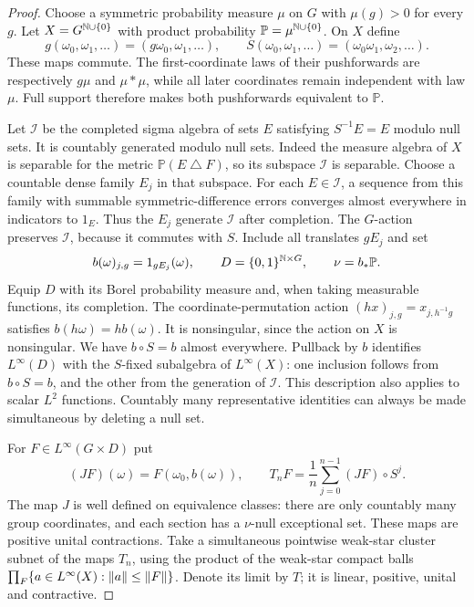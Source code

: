 \begin{proof}
Choose a symmetric probability measure $\mu$ on $G$ with $\mu(g)>0$ for
every $g$.  Let $X=G^{\mathbb N\cup\{0\}}$ with product probability
$\mathbb P=\mu^{\mathbb N\cup\{0\}}$.  On $X$ define
\[
 g(\omega_0,\omega_1,\ldots)=(g\omega_0,\omega_1,\ldots),\qquad
 S(\omega_0,\omega_1,\ldots)=(\omega_0\omega_1,\omega_2,\ldots).
\]
These maps commute.  The first-coordinate laws of their pushforwards are
respectively $g\mu$ and $\mu*\mu$, while all later coordinates remain
independent with law $\mu$.  Full support therefore makes both
pushforwards equivalent to $\mathbb P$.

Let $\mathcal I$ be the completed sigma algebra of sets $E$ satisfying
$S^{-1}E=E$ modulo null sets.  It is countably generated modulo null sets.
Indeed the measure algebra of $X$ is separable for the metric
$\mathbb P(E\mathbin\triangle F)$, so its subspace $\mathcal I$ is
separable.  Choose a countable dense family $E_j$ in that subspace.
For each $E\in\mathcal I$, a sequence from this family with summable
symmetric-difference errors converges almost everywhere in indicators
to $1_E$.  Thus the $E_j$ generate $\mathcal I$ after completion.
The $G$-action preserves $\mathcal I$, because it commutes with $S$.
Include all translates $gE_j$ and set
\[
 b(\omega)_{j,g}=1_{gE_j}(\omega),\qquad
 D=\{0,1\}^{\mathbb N\times G},\qquad \nu=b_*\mathbb P.
\]
Equip $D$ with its Borel probability measure and, when taking measurable
functions, its completion.  The coordinate-permutation action
$(h x)_{j,g}=x_{j,h^{-1}g}$ satisfies $b(h\omega)=h b(\omega)$.
It is nonsingular, since the action on $X$ is nonsingular.  We have
$b\circ S=b$ almost everywhere.  Pullback by $b$ identifies
$L^\infty(D)$ with the $S$-fixed subalgebra of $L^\infty(X)$: one
inclusion follows from $b\circ S=b$, and the other from the generation
of $\mathcal I$.  This description also applies to scalar $L^2$
functions.  Countably many representative identities can always be
made simultaneous by deleting a null set.

For $F\in L^\infty(G\times D)$ put
\[
 (JF)(\omega)=F(\omega_0,b(\omega)),\qquad
 T_nF=\frac1n\sum_{j=0}^{n-1}(JF)\circ S^j.
\]
The map $J$ is well defined on equivalence classes: there are only
countably many group coordinates, and each section has a $\nu$-null
exceptional set.  These maps are positive unital contractions.  Take a
simultaneous pointwise weak-star cluster subnet of the maps $T_n$, using
the product of the weak-star compact balls
$\prod_F\{a\in L^\infty(X):\lVert a\rVert\le\lVert F\rVert\}$.  Denote its
limit by $T$; it is linear, positive, unital and contractive.


\end{proof}
